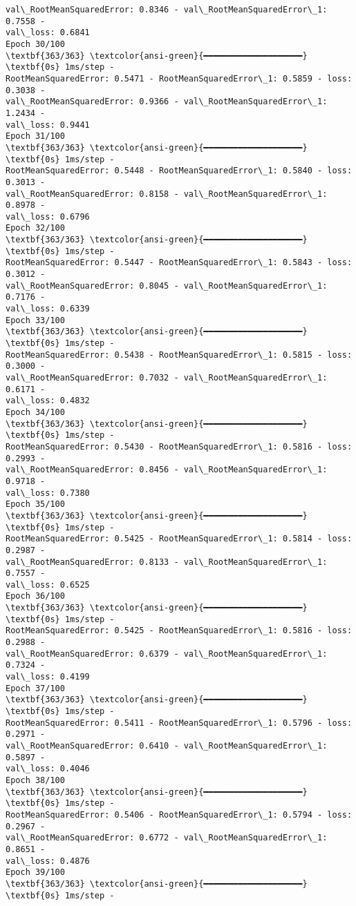 \documentclass[12pt letter]{report}
\begin{document}
\begin{Verbatim}[commandchars=\\\{\}]
val\_RootMeanSquaredError: 0.8346 - val\_RootMeanSquaredError\_1: 0.7558 -
val\_loss: 0.6841
Epoch 30/100
\textbf{363/363} \textcolor{ansi-green}{━━━━━━━━━━━━━━━━━━━━} \textbf{0s} 1ms/step -
RootMeanSquaredError: 0.5471 - RootMeanSquaredError\_1: 0.5859 - loss: 0.3038 -
val\_RootMeanSquaredError: 0.9366 - val\_RootMeanSquaredError\_1: 1.2434 -
val\_loss: 0.9441
Epoch 31/100
\textbf{363/363} \textcolor{ansi-green}{━━━━━━━━━━━━━━━━━━━━} \textbf{0s} 1ms/step -
RootMeanSquaredError: 0.5448 - RootMeanSquaredError\_1: 0.5840 - loss: 0.3013 -
val\_RootMeanSquaredError: 0.8158 - val\_RootMeanSquaredError\_1: 0.8978 -
val\_loss: 0.6796
Epoch 32/100
\textbf{363/363} \textcolor{ansi-green}{━━━━━━━━━━━━━━━━━━━━} \textbf{0s} 1ms/step -
RootMeanSquaredError: 0.5447 - RootMeanSquaredError\_1: 0.5843 - loss: 0.3012 -
val\_RootMeanSquaredError: 0.8045 - val\_RootMeanSquaredError\_1: 0.7176 -
val\_loss: 0.6339
Epoch 33/100
\textbf{363/363} \textcolor{ansi-green}{━━━━━━━━━━━━━━━━━━━━} \textbf{0s} 1ms/step -
RootMeanSquaredError: 0.5438 - RootMeanSquaredError\_1: 0.5815 - loss: 0.3000 -
val\_RootMeanSquaredError: 0.7032 - val\_RootMeanSquaredError\_1: 0.6171 -
val\_loss: 0.4832
Epoch 34/100
\textbf{363/363} \textcolor{ansi-green}{━━━━━━━━━━━━━━━━━━━━} \textbf{0s} 1ms/step -
RootMeanSquaredError: 0.5430 - RootMeanSquaredError\_1: 0.5816 - loss: 0.2993 -
val\_RootMeanSquaredError: 0.8456 - val\_RootMeanSquaredError\_1: 0.9718 -
val\_loss: 0.7380
Epoch 35/100
\textbf{363/363} \textcolor{ansi-green}{━━━━━━━━━━━━━━━━━━━━} \textbf{0s} 1ms/step -
RootMeanSquaredError: 0.5425 - RootMeanSquaredError\_1: 0.5814 - loss: 0.2987 -
val\_RootMeanSquaredError: 0.8133 - val\_RootMeanSquaredError\_1: 0.7557 -
val\_loss: 0.6525
Epoch 36/100
\textbf{363/363} \textcolor{ansi-green}{━━━━━━━━━━━━━━━━━━━━} \textbf{0s} 1ms/step -
RootMeanSquaredError: 0.5425 - RootMeanSquaredError\_1: 0.5816 - loss: 0.2988 -
val\_RootMeanSquaredError: 0.6379 - val\_RootMeanSquaredError\_1: 0.7324 -
val\_loss: 0.4199
Epoch 37/100
\textbf{363/363} \textcolor{ansi-green}{━━━━━━━━━━━━━━━━━━━━} \textbf{0s} 1ms/step -
RootMeanSquaredError: 0.5411 - RootMeanSquaredError\_1: 0.5796 - loss: 0.2971 -
val\_RootMeanSquaredError: 0.6410 - val\_RootMeanSquaredError\_1: 0.5897 -
val\_loss: 0.4046
Epoch 38/100
\textbf{363/363} \textcolor{ansi-green}{━━━━━━━━━━━━━━━━━━━━} \textbf{0s} 1ms/step -
RootMeanSquaredError: 0.5406 - RootMeanSquaredError\_1: 0.5794 - loss: 0.2967 -
val\_RootMeanSquaredError: 0.6772 - val\_RootMeanSquaredError\_1: 0.8651 -
val\_loss: 0.4876
Epoch 39/100
\textbf{363/363} \textcolor{ansi-green}{━━━━━━━━━━━━━━━━━━━━} \textbf{0s} 1ms/step -

\end{Verbatim}
\end{document}
